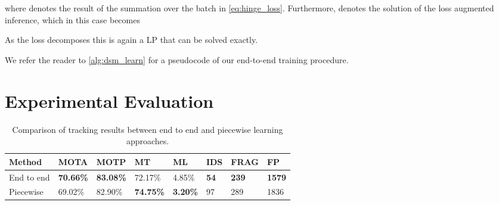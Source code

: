 \documentclass[letterpaper, 10 pt, conference]{ieeeconf}  \pdfminorversion=4
\begin{document}
where  denotes the result of the summation over the batch  in \autoref{eq:hinge_loss}.  Furthermore,  denotes the solution of the loss augmented inference, which in this case becomes 

As the loss decomposes this is again a LP that can be solved exactly. 


We refer the reader to \autoref{alg:dsm_learn} for a pseudocode of our end-to-end training procedure.



 \section{Experimental Evaluation}
\label{sec:experimental_evaluation}


\begin{table*}[htb]
 \centering
 \begin{tabular}{llllllll}
   \hline
   Method & MOTA & MOTP & MT & ML & IDS & FRAG & FP \\\hline
   End to end & \textbf{70.66\%} & \textbf{83.08\%} & 72.17\% & 4.85\% & \textbf{54} & \textbf{239} & \textbf{1579}\\
   Piecewise & 69.02\% & 82.90\% & \textbf{74.75\%} & \textbf{3.20\%} & 97 & 289 & 1836\\
   \hline
 \end{tabular}
\caption{Comparison of tracking results between end to end and piecewise learning approaches.}
\label{tab:tracking-results}
\end{table*}
\end{document}
